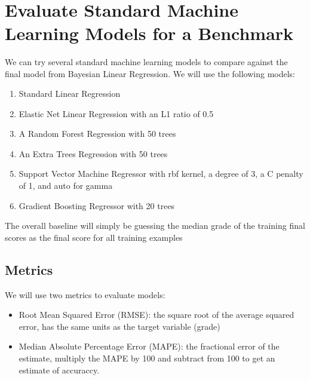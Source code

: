 \documentclass[11pt]{article}
\providecommand{\tightlist}{%
      \setlength{\itemsep}{0pt}\setlength{\parskip}{0pt}}
\begin{document}
    \begin{center}
    \end{center}
    { \hspace*{\fill} \\}
    
    \hypertarget{evaluate-standard-machine-learning-models-for-a-benchmark}{%
\section{Evaluate Standard Machine Learning Models for a
Benchmark}\label{evaluate-standard-machine-learning-models-for-a-benchmark}}

We can try several standard machine learning models to compare against
the final model from Bayesian Linear Regression. We will use the
following models:

\begin{enumerate}
\def\labelenumi{\arabic{enumi}.}
\tightlist
\item
  Standard Linear Regression
\item
  Elastic Net Linear Regression with an L1 ratio of 0.5
\item
  A Random Forest Regression with 50 trees
\item
  An Extra Trees Regression with 50 trees
\item
  Support Vector Machine Regressor with rbf kernel, a degree of 3, a C
  penalty of 1, and auto for gamma
\item
  Gradient Boosting Regressor with 20 trees
\end{enumerate}

The overall baseline will simply be guessing the median grade of the
training final scores as the final score for all training examples

\hypertarget{metrics}{%
\subsection{Metrics}\label{metrics}}

We will use two metrics to evaluate models:

\begin{itemize}
\tightlist
\item
  Root Mean Squared Error (RMSE): the square root of the average squared
  error, has the same units as the target variable (grade)
\item
  Median Absolute Percentage Error (MAPE): the fractional error of the
  estimate, multiply the MAPE by 100 and subtract from 100 to get an
  estimate of accuraccy.
\end{itemize}
\end{document}
